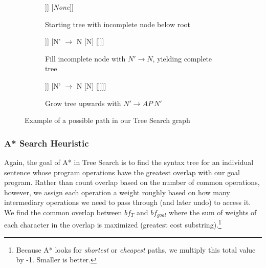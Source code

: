 \documentclass[runningheads]{llncs}
\newcommand{\code}[1]{\texttt{\textcolor{magenta}{\setlength{\fboxsep}{1pt}\colorbox{lightgray!20}{#1}}}}
\begin{document}
\begin{figure}
  \centering
	\centering
	\begin{subfigure}[b]{0.30\textwidth}
		\centering
		\begin{forest}
			[N' $\rightarrow$ AP N' [AP $\rightarrow$ A' [\text{Leaf}] [A' $\rightarrow$ A [A] [\text{Leaf}]]] [\textit{None}]]
\end{forest}
		\caption{Starting tree with incomplete node below root}
	\end{subfigure}
	\hspace{0.01\textwidth}
	\begin{subfigure}[b]{0.30\textwidth}
		\centering
		\begin{forest}
			[N' $\rightarrow$ AP N' [AP $\rightarrow$ A' [] [A' $\rightarrow$ A [A] [\text{Leaf}]]] [N' $\rightarrow$ N [N] [\text{Leaf}]]]
\end{forest}
\caption{Fill incomplete node with \mbox{$N' \rightarrow N$}, yielding complete tree}
	\end{subfigure}
	\hspace{0.01\textwidth}
	\begin{subfigure}[b]{0.30\textwidth}
		\centering
		\begin{forest}
			[N' $\rightarrow$ AP N' [\textit{None}] [N' $\rightarrow$ AP N' [AP $\rightarrow$ A' [] [A' $\rightarrow$ A [A] [\text{Leaf}]]] [N' $\rightarrow$ N [N] [\text{Leaf}]]]]
\end{forest}
\caption{Grow tree upwards with \mbox{$N' \rightarrow AP\ N'$}}
	\end{subfigure}
  \caption{Example of a possible path in our Tree Search graph}
  \label{fig:tree-search-graph}
\end{figure}

\subsubsection*{A* Search Heuristic}
Again, the goal of A* in Tree Search is to find the syntax tree for an individual sentence whose program operations have the greatest overlap with our goal program. Rather than count overlap based on the number of common operations, however, we assign each operation a weight roughly based on how many intermediary operations we need to pass through (and later undo) to access it. We find the common overlap between $bf_{T}$ and $bf_{goal}$ where the sum of weights of each character in the overlap is maximized (greatest cost substring).\footnote{Because A* looks for \textit{shortest} or \textit{cheapest} paths, we multiply this total value by -1. Smaller is better.}%
\end{document}
